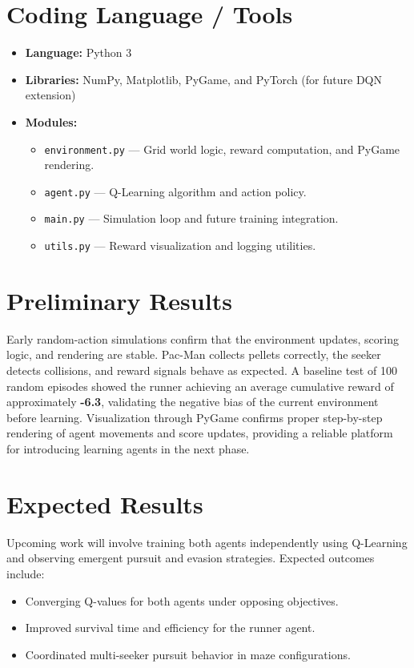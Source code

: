 \documentclass[conference]{IEEEtran}
\begin{document}
\section{Coding Language / Tools}
\begin{itemize}
    \item \textbf{Language:} Python 3
    \item \textbf{Libraries:} NumPy, Matplotlib, PyGame, and PyTorch (for future DQN extension)
    \item \textbf{Modules:}
    \begin{itemize}
        \item \texttt{environment.py} — Grid world logic, reward computation, and PyGame rendering. 
        \item \texttt{agent.py} — Q-Learning algorithm and action policy.  
        \item \texttt{main.py} — Simulation loop and future training integration.  
        \item \texttt{utils.py} — Reward visualization and logging utilities.  
    \end{itemize}
\end{itemize}

\section{Preliminary Results}
Early random-action simulations confirm that the environment updates, scoring logic, and rendering are stable. Pac-Man collects pellets correctly, the seeker detects collisions, and reward signals behave as expected.  
A baseline test of 100 random episodes showed the runner achieving an average cumulative reward of approximately \textbf{-6.3}, validating the negative bias of the current environment before learning.  
Visualization through PyGame confirms proper step-by-step rendering of agent movements and score updates, providing a reliable platform for introducing learning agents in the next phase.

\section{Expected Results}
Upcoming work will involve training both agents independently using Q-Learning and observing emergent pursuit and evasion strategies.  
Expected outcomes include:
\begin{itemize}
    \item Converging Q-values for both agents under opposing objectives.  
    \item Improved survival time and efficiency for the runner agent.  
    \item Coordinated multi-seeker pursuit behavior in maze configurations.  
\end{itemize}
\end{document}
